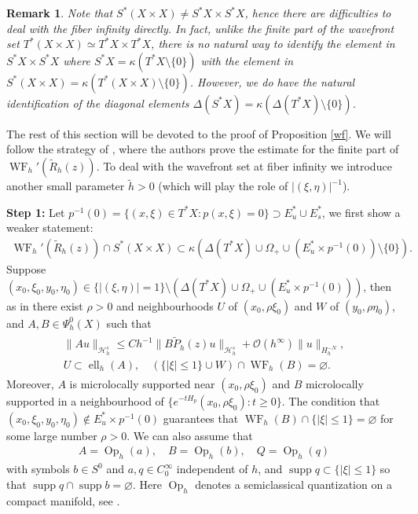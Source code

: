 \documentclass[reqno,12pt,letterpaper]{amsart}
\newtheorem{rem}[prop]{Remark}
\numberwithin{equation}{section}
\numberwithin{prop}{section}
\DeclareMathOperator{\Op}{Op}
\DeclareMathOperator{\supp}{supp}
\DeclareMathOperator{\el}{ell}
\DeclareMathOperator{\WF}{WF}
\begin{document}
\begin{rem}
Note that $S^*(X\times X)\neq S^*X\times S^*X$, hence there are difficulties to deal with the fiber infinity directly. In fact, unlike the finite part of the wavefront set $T^\ast(X\times X)\simeq T^\ast X\times T^\ast X$, there is no natural way to identify the element in $S^* X\times S^*X$ where $S^\ast X=\kappa(T^\ast X\setminus\{0\})$ with the element in $S^*(X\times X)=\kappa(T^\ast(X\times X)\setminus\{0\})$. However, we do have the natural identification of the diagonal elements $\Delta(S^\ast X)=\kappa(\Delta(T^\ast X)\setminus\{0\})$.
\end{rem}

The rest of this section will be devoted to the proof of Proposition \ref{wf}.
We will follow the strategy of \cite[Proposition 3.4]{zeta}, where the authors prove the estimate for the finite part of $\WF_h'(\widetilde{R}_h(z))$. To deal with the wavefront set at fiber infinity we introduce another small parameter $\tilde{h}>0$ (which will play the role of $|(\xi,\eta)|^{-1}$).

\noindent\textbf{Step 1:} Let $p^{-1}(0)=\{(x,\xi)\in T^*X: p(x,\xi)=0\}\supset E_u^\ast\cup E_s^\ast$, we first show a weaker statement:
\begin{align}
\label{e:semiwfweak}
    \WF_h'(\widetilde{R}_h(z))\cap S^*(X\times X)\subset \kappa(\Delta(T^*X)\cup \Omega_+\cup(E_u^*\times p^{-1}(0))\setminus\{0\}).
\end{align}
Suppose $(x_0,\xi_0,y_0,\eta_0)\in\{|(\xi,\eta)|= 1\}\setminus( \Delta(T^*X)\cup \Omega_+\cup (E_u^*\times p^{-1}(0)))$, then as in \cite[Proposition 3.4]{zeta} there exist $\rho>0$ and neighbourhoods $U$ of $(x_0,\rho\xi_0)$ and $W$ of $(y_0,\rho\eta_0)$, and $A,B\in\Psi^0_{h}(X)$ such that
\begin{align}\label{pos}
    \begin{split}
    \|Au\|_{\mathcal{H}^s_{h}}\leq Ch^{-1}\|B\widetilde{P}_h(z)u\|_{\mathcal{H}^s_{h}}+\mathcal{O}(h^\infty)\|u\|_{H_{h}^{-N}},\\
    U\subset\el_{h}(A),\quad (\{|\xi|\leq 1\}\cup W)\cap \WF_{h}(B)=\varnothing.
    \end{split}
\end{align}
Moreover, $A$ is microlocally supported near $(x_0,\rho\xi_0)$ and $B$ microlocally supported in a neighbourhood of $\{e^{-tH_p}(x_0,\rho\xi_0): t\geq 0\}$. The condition that $(x_0,\xi_0,y_0,\eta_0)\notin E_u^*\times p^{-1}(0)$ guarantees that $\WF_h(B)\cap \{|\xi|\leq 1\}=\varnothing$ for some large number $\rho>0$. We can also assume that 
\begin{align*}
   A=\Op_h(a),\quad B=\Op_h(b),\quad Q=\Op_h(q)
\end{align*}
with symbols $b\in S^0$ and $a,q\in C_0^\infty$ independent of $h$, and $\supp q\subset \{|\xi|\leq 1\}$ so that $\supp q\cap \supp b=\varnothing$.
Here $\Op_h$ denotes a semiclassical quantization on a compact manifold, see \cite[Appendix E]{resbook}.
\end{document}
